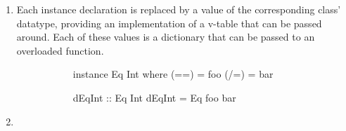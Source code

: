 \documentclass[dissertation.tex]{subfiles}
\begin{document}
{{{\begin{enumerate}
{                Further, each function defined by a typeclass is made into a top-level function that essentially extracts the implementation function from the passed dictionary (equivalent to extracting a function
                pointer entry from the method table).

                \begin{figure}[H]
                \centering
                \begin{subfigure}[t]{0.35\textwidth}
                \begin{haskellfigure}
                class Eq a where
                    (==) :: a -> a -> Bool
                    (/=) :: a -> a -> Bool
                \end{haskellfigure}
                \end{subfigure}
                \hspace{5mm}
                \begin{subfigure}[t]{0.55\textwidth}
                \begin{haskellfigure}
                data Eq a = Eq (a -> a -> Bool) (a -> a -> Bool)

                (==), (/=) :: Eq a -> a -> a -> Bool
                (==) (Eq eq _) = eq
                (/=) (Eq _ neq) = neq
                \end{haskellfigure}
                \end{subfigure}
                \end{figure}
            }
            \item
            {
                Each instance declaration is replaced by a value of the corresponding class' datatype, providing an
                implementation of a v-table that can be passed around. Each of these values is a dictionary that can be
                passed to an overloaded function.

                \begin{figure}[H]
                \centering
                \begin{subfigure}[t]{0.25\textwidth}
                \begin{haskellfigure}
                instance Eq Int where
                    (==) = foo
                    (/=) = bar
                \end{haskellfigure}
                \end{subfigure}
                \hspace{5mm}
                \begin{subfigure}[t]{0.25\textwidth}
                \begin{haskellfigure}
                dEqInt :: Eq Int
                dEqInt = Eq foo bar
                \end{haskellfigure}
                \end{subfigure}
                \end{figure}
            }
            \item
            {

}
\end{enumerate}}}}
\end{document}
